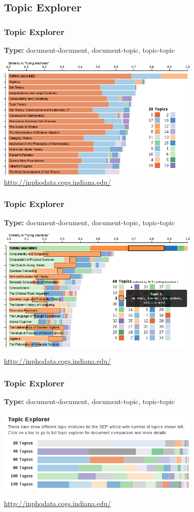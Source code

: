 \documentclass[t]{beamer}
\begin{document}
\subsection{Topic Explorer}
\begin{frame}
\frametitle{Topic Explorer}
\textbf{Type:} document-document, document-topic, topic-topic

\includegraphics[width=0.75\textwidth]{img/topex20.png}
\url{http://inphodata.cogs.indiana.edu/}

\cite{aaai2015}
\end{frame}

\begin{frame}
\frametitle{Topic Explorer}
\textbf{Type:} document-document, document-topic, topic-topic

\includegraphics[width=0.75\textwidth]{img/topex40.png}

\url{http://inphodata.cogs.indiana.edu/}

\cite{aaai2015}
\end{frame}

\begin{frame}
\frametitle{Topic Explorer}
\textbf{Type:} document-document, document-topic, topic-topic

\includegraphics[width=0.75\textwidth]{img/topex-comparison.png}

\url{http://inphodata.cogs.indiana.edu/}

\cite{aaai2015}
\end{frame}
\end{document}
